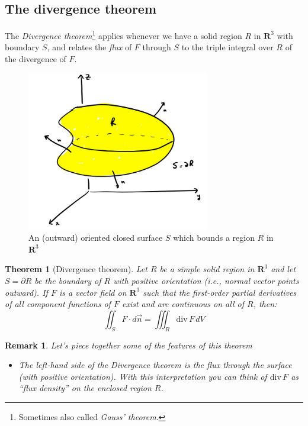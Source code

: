 \documentclass[12pt]{article}
\numberwithin{equation}{subsection}
\numberwithin{figure}{subsection}
\newtheorem{thm}[subsection]{Theorem}
\theoremstyle{note}
\newtheorem{remark}[subsection]{Remark}
\newcommand{\dv}{\mathrm{div\,}}
\begin{document}
{\subsection{The divergence theorem}\label{div-thm-sec}

The \textit{Divergence theorem}\footnote{Sometimes also called \textit{Gauss' theorem}.}  applies whenever we have a solid region $R$ in $\mathbf{R}^3$ with boundary $S$, and relates the \textit{flux} of $F$ through $S$ to the triple integral over $R$ of the divergence of $F$. 
\begin{figure}[h!]
\centering
\includegraphics[width=80mm]{Images/region-div-thm}
\caption{An (outward) oriented closed surface $S$ which bounds a region $R$ in $\mathbf{R}^3$}
\label{fig-region-div-thm}
\end{figure}

\begin{thm}[Divergence theorem]\label{thm-divergence} Let $R$ be a simple solid region in $\mathbf{R}^3$ and let $S=\partial R$ be the boundary of $R$ with positive orientation (i.e., normal vector points outward). If $F$ is a vector field on $\mathbf{R}^3$ such that the first-order partial derivatives of all component functions of $F$ exist and are continuous on all of $R$, then:
\begin{equation} \label{div-thm}
	\iint_{S} F\cdot d\vec{n}= \iiint_R \dv F \,dV 
\end{equation}
\end{thm}

\begin{remark} Let's piece together some of the features of this theorem
\begin{itemize}
\item The left-hand side of the Divergence theorem is the \textit{flux} through the surface (with positive orientation). With this interpretation you can think of $\dv F$ as ``flux density'' on the enclosed region $R$. 




\end{itemize}
\end{remark}}
\end{document}
